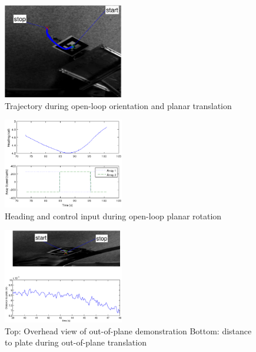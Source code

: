 \documentclass[letterpaper, 10 pt, conference]{ieeeconf}  %
\begin{document}
   \begin{figure}[thpb]
      \centering
      \includegraphics[width = 0.47\textwidth]{figures/driving_forward_trajectory.eps}
      \caption{Trajectory during open-loop orientation and planar translation}
      \label{fig:planartranslationtrajectory}
   \end{figure}
   
      \begin{figure}[thpb]
      \centering
      \includegraphics[width = 0.47\textwidth]{figures/planar_rotation.eps}
      \caption{Heading and control input during open-loop planar rotation}
      \label{fig:planartranslationtrajectory}
   \end{figure}
   
         \begin{figure}[thpb]
      \centering
      \includegraphics[width = 0.47\textwidth]{figures/oop_translation.eps}
      \caption{Top: Overhead view of out-of-plane demonstration Bottom: distance to plate during out-of-plane translation}
      \label{fig:ooptranslation}
   \end{figure}
   
\end{document}
